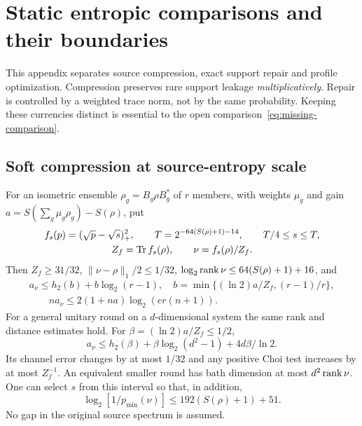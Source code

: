 \section{Static entropic comparisons and their boundaries}
\label{app:static}

This appendix separates source compression, exact support repair and
profile optimization. Compression preserves rare support leakage
\emph{multiplicatively}. Repair is controlled by a weighted trace norm,
not by the same probability. Keeping these currencies distinct is
essential to the open comparison~\eqref{eq:missing-comparison}.

\subsection{Soft compression at source-entropy scale}
\begin{lemma}\label{lem:soft-source}
For an isometric ensemble $\rho_g=B_g\rho B_g^*$ of $r$ members, with
weights $\mu_g$ and gain $a=S(\sum_g\mu_g\rho_g)-S(\rho)$, put
\begin{gather*}
 f_s(p)=(\sqrt p-\sqrt s)_+^2,\qquad
 T=2^{-64(S(\rho)+1)-14},\qquad T/4\leq s\leq T,\\
 Z_f=\operatorname{Tr} f_s(\rho),\qquad \nu=f_s(\rho)/Z_f.
\end{gather*}
Then $Z_f\geq31/32$, $\|\nu-\rho\|_1/2\leq1/32$,
$\log_2\operatorname{rank}\nu\leq64(S(\rho)+1)+16$, and
\begin{gather*}
 a_\nu\leq h_2(b)+b\log_2(r-1),\quad
 b=\min\{(\ln2)a/Z_f,(r-1)/r\},\\
 \qquad na_\nu\leq2(1+na)\log_2(er(n+1)).
\end{gather*}
For a general unitary round on a $d$-dimensional system the same
rank and distance estimates hold. For $\beta=(\ln2)a/Z_f\leq1/2$,
\begin{equation}\label{eq:general-filter-production}
 a_\nu\leq h_2(\beta)+\beta\log_2(d^2-1)+4d\beta/\ln2.
\end{equation}
Its channel error changes by at most $1/32$ and any positive Choi test
increases by at most $Z_f^{-1}$. An equivalent smaller round has bath
dimension at most $d^2\operatorname{rank}\nu$.
One can select $s$ from this interval so that, in addition,
\begin{equation}\label{eq:selected-source-floor}
 \log_2[1/p_{\min}(\nu)]\leq192(S(\rho)+1)+51.
\end{equation}
No gap in the original source spectrum is assumed.
\end{lemma}

